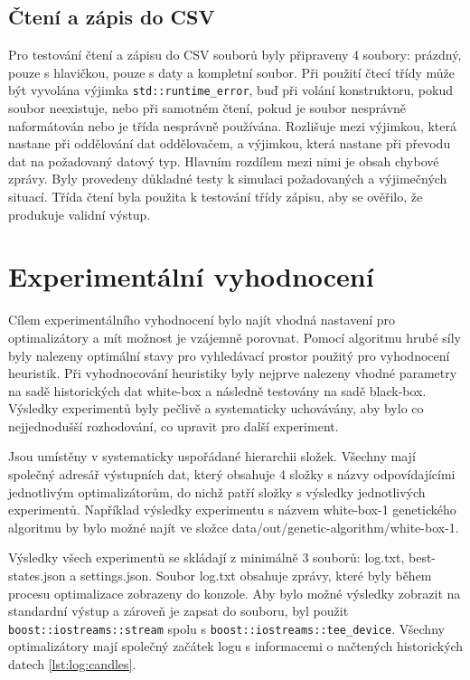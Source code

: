 \section{Čtení a zápis do CSV}
Pro testování čtení a zápisu do CSV souborů byly připraveny 4 soubory: prázdný, pouze s hlavičkou, pouze s daty a kompletní soubor.
Při použití čtecí třídy může být vyvolána výjimka \texttt{std::runtime\_error}, buď při volání konstruktoru, pokud soubor neexistuje, nebo při samotném čtení, pokud je soubor nesprávně naformátován nebo je třída nesprávně používána.
Rozlišuje mezi výjimkou, která nastane při oddělování dat oddělovačem, a výjimkou, která nastane při převodu dat na požadovaný datový typ.
Hlavním rozdílem mezi nimi je obsah chybové zprávy.
Byly provedeny důkladné testy k simulaci požadovaných a výjimečných situací.
Třída čtení byla použita k testování třídy zápisu, aby se ověřilo, že produkuje validní výstup.

\chapter{Experimentální vyhodnocení}
Cílem experimentálního vyhodnocení bylo najít vhodná nastavení pro optimalizátory a mít možnost je vzájemně porovnat.
Pomocí algoritmu hrubé síly byly nalezeny optimální stavy pro vyhledávací prostor použitý pro vyhodnocení heuristik.
Při vyhodnocování heuristiky byly nejprve nalezeny vhodné parametry na sadě historických dat white-box a následně testovány na sadě black-box.
Výsledky experimentů byly pečlivě a systematicky uchovávány, aby bylo co nejjednodušší rozhodování, co upravit pro další experiment.

Jsou umístěny v systematicky uspořádané hierarchii složek.
Všechny mají společný adresář výstupních dat, který obsahuje 4 složky s názvy odpovídajícími jednotlivým optimalizátorům, do nichž patří složky s výsledky jednotlivých experimentů.
Například výsledky experimentu s názvem white-box-1 genetického algoritmu by bylo možné najít ve složce data/out/genetic-algorithm/white-box-1.

Výsledky všech experimentů se skládají z minimálně 3 souborů: log.txt, best-states.json a settings.json.
Soubor log.txt obsahuje zprávy, které byly během procesu optimalizace zobrazeny do konzole.
Aby bylo možné výsledky zobrazit na standardní výstup a zároveň je zapsat do souboru, byl použit \texttt{boost::iostreams::stream} spolu s \texttt{boost::iostreams::tee\_device}.
Všechny optimalizátory mají společný začátek logu s informacemi o načtených historických datech \ref{lst:log:candles}.

